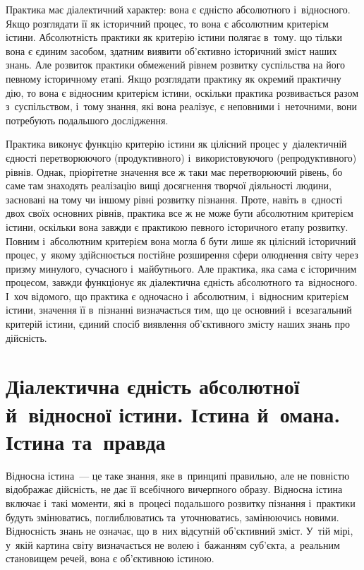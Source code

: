 \documentclass[a5paper,oneside,DIV=12,12pt,headings=small]{scrartcl}
\begin{document}
		Практика має діалектичний характер: вона є єдністю абсолютного і~відносного. Якщо розглядати її як історичний процес, то вона є абсолютним критерієм істини. Абсолютність практики як критерію істини полягає в~тому. що тільки вона є єдиним засобом, здатним виявити об'\-єк\-тив\-но історичний зміст наших знань. Але розвиток практики обмежений рівнем розвитку суспільства на його певному історичному етапі. Якщо розглядати практику як окремий практичну дію, то вона є відносним критерієм істини, оскільки практика розвивається разом з~суспільством, і~тому знання, які вона реалізує, є неповними і~неточними, вони потребують подальшого дослідження.
		
		Практика виконує функцію критерію істини як цілісний процес у~діалектичній єдності перетворюючого (продуктивного) і~використовуючого (репродуктивного) рівнів. Однак, пріорітетне значення все ж таки має перетворюючий рівень, бо саме там знаходять реалізацію вищі досягнення творчої діяльності людини, засновані на тому чи іншому рівні розвитку пізнання. Проте, навіть в~єдності двох своїх основних рівнів, практика все ж не може бути абсолютним критерієм істини, оскільки вона завжди є практикою певного історичного етапу розвитку. Повним і~абсолютним критерієм вона могла б бути лише як цілісний історичний процес, у~якому здійснюється постійне розширення сфери олюднення світу через призму минулого, сучасного і~майбутнього. Але практика, яка сама є історичним процесом, завжди функціонує як діалектична єдність абсолютного та~відносного. І~хоч відомого, що практика є одночасно і~абсолютним, і~відносним критерієм істини, значення її в~пізнанні визначається тим, що це основний і~всезагальний критерій істини, єдиний спосіб виявлення об'\-єк\-тив\-но\-го змісту наших знань про дійсність.

	\section{Діалектична єдність абсолютної й~відносної істини. Істина й~омана. Істина та~правда}
		Відносна істина~— це таке знання, яке в~принципі правильно, але не повністю відображає дійсність, не дає її всебічного вичерпного образу. Відносна істина включає і~такі моменти, які в~процесі подальшого розвитку пізнання і~практики будуть змінюватись, поглиблюватись та~уточнюватись, замінюючись новими. Відносність знань не означає, що в~них відсутній об'\-єк\-тив\-ний зміст. У~тій мірі, у~якій картина світу визначається не волею і~бажанням суб'\-єкта, а~реальним становищем речей, вона є об'\-єк\-тив\-ною істиною.
\end{document}
